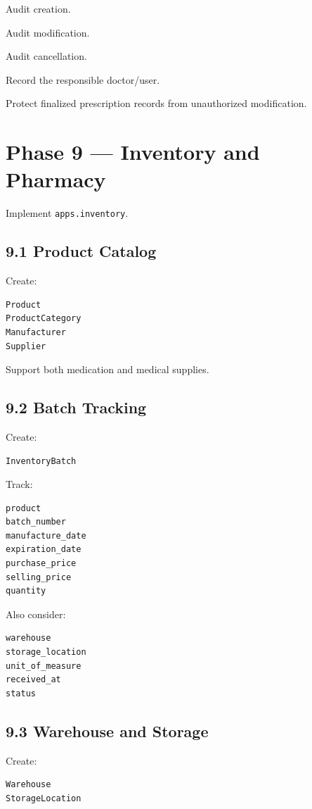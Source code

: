 \documentclass[11pt,a4paper]{article}
\newcommand{\task}[1]{\item[$\square$] #1}
\begin{document}
\task{Audit creation.}
\task{Audit modification.}
\task{Audit cancellation.}
\task{Record the responsible doctor/user.}
\task{Protect finalized prescription records from unauthorized modification.}

\section{Phase 9 --- Inventory and Pharmacy}

Implement \texttt{apps.inventory}.

\subsection{9.1 Product Catalog}

Create:

\begin{lstlisting}
Product
ProductCategory
Manufacturer
Supplier
\end{lstlisting}

Support both medication and medical supplies.

\subsection{9.2 Batch Tracking}

Create:

\begin{lstlisting}
InventoryBatch
\end{lstlisting}

Track:

\begin{lstlisting}
product
batch_number
manufacture_date
expiration_date
purchase_price
selling_price
quantity
\end{lstlisting}

Also consider:

\begin{lstlisting}
warehouse
storage_location
unit_of_measure
received_at
status
\end{lstlisting}

\subsection{9.3 Warehouse and Storage}

Create:

\begin{lstlisting}
Warehouse
StorageLocation
\end{lstlisting}
\end{document}
